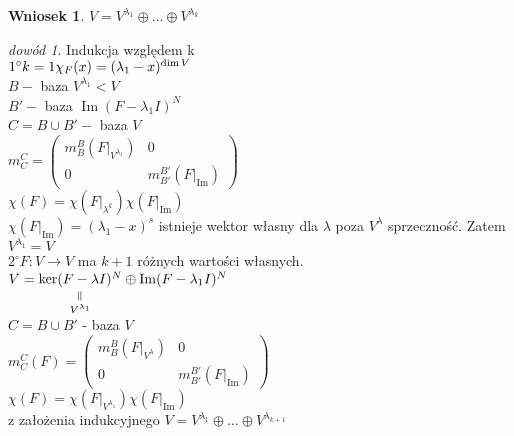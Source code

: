 \documentclass[10pt]{article}
\newcommand{\verteq}{\rotatebox{90}{$=$}}
\newcommand{\underscript}[3]{\underset{\scriptstyle{\overset{#2}{#3}}}{#1}}
\theoremstyle{definition}
\theoremstyle{definition}
\theoremstyle{definition}
\theoremstyle{definition}
\theoremstyle{remark}
\newtheorem*{dd}{dowód}
\theoremstyle{definition}
\theoremstyle{definition}
\newtheorem*{wn}{Wniosek}
\theoremstyle{definition}
\theoremstyle{definition}
\theoremstyle{definition}
\begin{document}
\begin{wn} $V = V^{\lambda_1} \oplus \ldots \oplus V^{\lambda_k}$ \end{wn}
\begin{dd} 
    Indukcja względem k \\ 
    $1^{\circ} k=1 \\ \chi_F (x) = (\lambda_1 -x )^{\dim V}$ \\ 
    $B - $ baza $V ^{\lambda_1} < V$ \\ 
    $B'  - $ baza $\operatorname{Im} (F - \lambda_1 I)^N$ \\ 
    $C = B \cup B' - $ baza $V$ \\  
    $ m_C^C = \begin{pmatrix} 
        m_B^B(F|_{V^{\lambda_1}}) & 0 \\ 0 & m_{B'}^{B'} (F|_{\operatorname{Im}})
    \end{pmatrix}$ \\ 
    $\chi (F) = \chi(F|_{\lambda^k}) \chi(F|_{\operatorname{Im}})$ \\ 
    $\chi(F|_{\operatorname{Im}}) = (\lambda_1 - x)^s$ istnieje wektor własny dla $\lambda$ poza $V^\lambda$ 
    sprzeczność. Zatem $V^{\lambda_1} = V$ \\ 
    $2^{\circ} F: V \to V$ ma $k+1$ różnych wartości własnych. \\ 
    $ V = \underscript{\ker(F-\lambda I)^N}{\verteq}{V^{\lambda_1}} \oplus \operatorname{Im}(F - \lambda_1 I)^N$ \\ 
    $C = B \cup B'$ - baza $V$  \\ 
    $m_C^C (F) = \begin{pmatrix} m_B^B (F|_{V^\lambda})  &0 \\ 0 & m_{B'}^{B'} (F|_{\operatorname{Im}}) \end{pmatrix}$ \\ 
    $\chi(F) = \chi (F|_{V^{\lambda_1}}) \chi(F|_{\operatorname{Im}})$ \\ 
    z założenia indukcyjnego $V = V^{\lambda_1} \oplus \ldots \oplus V^{\lambda_{k+1}}$
\end{dd} 
\end{document}

